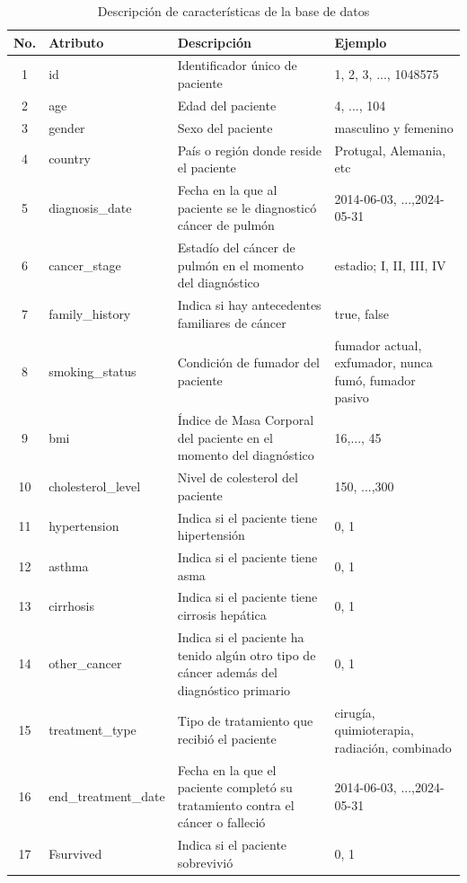 \documentclass[10pt,journal,compsoc]{IEEEtran}
\begin{document}
\begin{table}[h!]
\centering
\begin{tabularx}{\columnwidth}{|c|X|X|X|}
\hline
\textbf{No.} & \textbf{Atributo} & \textbf{Descripción} & \textbf{Ejemplo} \\ \hline
1  & id & Identificador único de paciente &1, 2, 3, ..., 1048575 \\ \hline
2  & age & Edad del paciente & 4, ..., 104 \\ \hline
3  & gender & Sexo del paciente  & masculino y femenino \\ \hline
4  & country & País o región donde reside el paciente & Protugal, Alemania, etc  \\ \hline
5  & diagnosis\_date & Fecha en la que al paciente se le diagnosticó cáncer de pulmón & 2014-06-03, ...,2024-05-31 \\ \hline
6  & cancer\_stage & Estadío del cáncer de pulmón en el momento del diagnóstico & estadio; I,  II, III, IV \\ \hline
7  & family\_history & Indica si hay antecedentes familiares de cáncer & true, false \\ \hline
8  & smoking\_status & Condición de fumador del paciente &  fumador actual, exfumador, nunca fumó, fumador pasivo\\ \hline
9  & bmi & Índice de Masa Corporal del paciente en el momento del diagnóstico & 16,..., 45 \\ \hline
10 & cholesterol\_level & Nivel de colesterol del paciente & 150, ...,300 \\ \hline
11 & hypertension & Indica si el paciente tiene hipertensión & 0, 1 \\ \hline
12 & asthma & Indica si el paciente tiene asma &  0, 1 \\ \hline
13 & cirrhosis & Indica si el paciente tiene cirrosis hepática & 0, 1 \\ \hline
14 & other\_cancer & Indica si el paciente ha tenido algún otro tipo de cáncer además del diagnóstico primario & 0, 1 \\ \hline
15 & treatment\_type & Tipo de tratamiento que recibió el paciente & cirugía, quimioterapia, radiación, combinado \\ \hline
16 & end\_treatment\_date & Fecha en la que el paciente completó su tratamiento contra el cáncer o falleció & 2014-06-03, ...,2024-05-31 \\ \hline
17 & Fsurvived & Indica si el paciente sobrevivió & 0, 1 \\ \hline
\end{tabularx}
\caption{Descripción de características de la base de datos}
\label{tab:caracteristicas}
\end{table}
 
\end{document}
